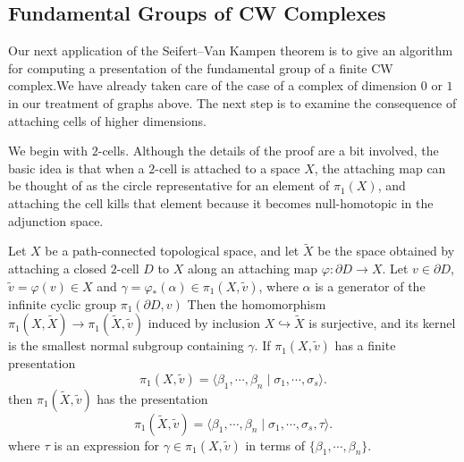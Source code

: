 \subsection{Fundamental Groups of CW Complexes}
Our next application of the Seifert–Van Kampen theorem is to give an algorithm for computing a presentation of the fundamental group of a finite CW complex.We have already taken care of the case of a complex of dimension $0$ or $1$ in our treatment
of graphs above. The next step is to examine the consequence of attaching cells of
higher dimensions.\par
We begin with $2$-cells. Although the details of the proof are a bit involved, the basic idea is that when a $2$-cell is attached to a space $X$, the attaching map can be thought of as the circle representative for an element of $\pi_1(X)$, and attaching the cell kills that element because it becomes null-homotopic in the adjunction space.
\begin{proposition}\label{attaching disk}
Let $X$ be a path-connected topological space, and let $\widetilde{X}$ be the space obtained by attaching a closed $2$-cell $D$ to $X$ along an attaching map $\varphi:\partial D\to X$. Let $v\in\partial D$, $\widetilde{v}=\varphi(v)\in X$ and $\gamma=\varphi_*(\alpha)\in\pi_1(X,\widetilde{v})$, where $\alpha$ is a generator of the infinite cyclic group $\pi_1(\partial D,v)$ Then the homomorphism $\pi_1(X,\widetilde{X})\to\pi_1(\widetilde{X},\widetilde{v})$ induced by inclusion $X\hookrightarrow\widetilde{X}$ is surjective, and its kernel is the smallest normal subgroup containing $\gamma$. If $\pi_1(X,\widetilde{v})$ has a finite presentation
\[\pi_1(X,\widetilde{v})=\langle\beta_1,\cdots,\beta_n\mid\sigma_1,\cdots,\sigma_s\rangle.\]
then $\pi_1(\widetilde{X},\widetilde{v})$ has the presentation
\[\pi_1(\widetilde{X},\widetilde{v})=\langle\beta_1,\cdots,\beta_n\mid\sigma_1,\cdots,\sigma_s,\tau\rangle.\]
where $\tau$ is an expression for $\gamma\in\pi_1(X,\widetilde{v})$ in terms of $\{\beta_1,\cdots,\beta_n\}$.
\end{proposition}
